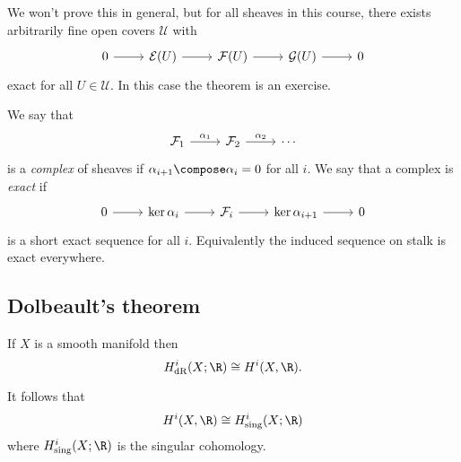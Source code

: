 \documentclass[a4paper]{article}
\begin{document}
We won't prove this in general, but for all sheaves in this course, there exists arbitrarily fine open covers \(\mathcal U\) with
\[
  \begin{tikzcd}
    0 \ar[r] & \mathcal E(U) \ar[r] & \mathcal F(U) \ar[r] & \mathcal G(U) \ar[r] & 0
  \end{tikzcd}
\]
exact for all \(U \in \mathcal U\). In this case the theorem is an exercise.

We say that
\[
  \begin{tikzcd}
    \mathcal F_1 \ar[r, "\alpha_1"] & \mathcal F_2 \ar[r, "\alpha_2"] & \cdots
  \end{tikzcd}
\]
is a \emph{complex} of sheaves if \(\alpha_{i + 1} \compose \alpha_i = 0\) for all \(i\). We say that a complex is \emph{exact} if
\[
  \begin{tikzcd}
    0 \ar[r] & \ker \alpha_i \ar[r] & \mathcal F_i \ar[r] & \ker \alpha_{i + 1} \ar[r] & 0 
  \end{tikzcd}
\]
is a short exact sequence for all \(i\). Equivalently the induced sequence on stalk is exact everywhere.

\subsection{Dolbeault's theorem}

\begin{theorem}[de Rham]
  If \(X\) is a smooth manifold then
  \[
    H^i_{\text{dR}}(X; \R) \cong H^i(X, \R).
  \]
\end{theorem}

\begin{remark}
  It follows that
  \[
    H^i(X, \R) \cong H^i_{\text{sing}}(X; \R)
  \]
  where \(H^i_{\text{sing}}(X; \R)\) is the singular cohomology.
\end{remark}
\end{document}
